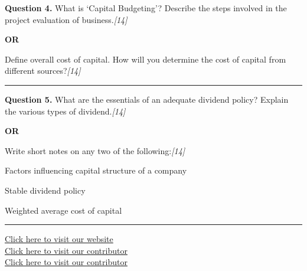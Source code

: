 \documentclass[11pt,a4paper]{article}
\newcommand{\pts}[1]{\hfill   \textit{[#1]}}
\begin{document}
\noindent   \textbf{Question 4.}
What is `Capital Budgeting'? Describe the steps involved in the project evaluation of business.\pts{14}

\centerline{   \textbf{OR}}

Define overall cost of capital. How will you determine the cost of capital from different sources?\pts{14}

\medskip\rule{\linewidth}{0.2pt}




\noindent   \textbf{Question 5.}
What are the essentials of an adequate dividend policy? Explain the various types of dividend.\pts{14}

\centerline{   \textbf{OR}}

Write short notes on any two of the following:\pts{14}

\begin{parts}
  \item Factors influencing capital structure of a company
  \item Stable dividend policy
  \item Weighted average cost of capital
\end{parts}

\vfill
\rule{\linewidth}{0.4pt}

\begin{center}\small
\href{https://bhu-exam.vercel.app/}{Click here to visit our website}\\[4pt]
\href{https://me-aryan.vercel.app/}{Click here to visit our contributor}\\[4pt]
\href{https://quashan-me.vercel.app/}{Click here to visit our contributor}
\end{center}
\end{document}
